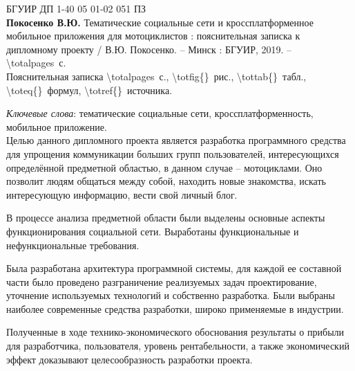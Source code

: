 \thispagestyle{empty}


\noindent
{БГУИР ДП 1-40 05 01-02 051 ПЗ}\\

\textbf{Покосенко В.Ю.} Тематические социальные сети и кроссплатформенное мобильное приложения для мотоциклистов : пояснительная записка к дипломному проекту / В.Ю. Покосенко. – Минск : БГУИР, 2019. – \num{\totalpages}~с. \\

Пояснительная записка \num{\totalpages}~с., \num{\totfig{}}~рис., \num{\tottab{}}~табл., \num{\toteq{}}~формул, \num{\totref{}}~источника.

\emph{Ключевые слова}: тематические социальные сети, кроссплатформенность, мобильное приложение. \\

Целью данного дипломного проекта является разработка программного средства 
для упрощения коммуникации больших групп пользователей,
интересующихся определённой предметной областью, в данном случае --
мотоциклами. Оно позволит людям общаться между собой, находить новые
знакомства, искать интересующую информацию, вести свой личный блог.

В процессе анализа предметной области были выделены основные аспекты функционирования социальной сети. Выработаны функциональные и нефункциональные требования.

Была разработана архитектура программной системы, для каждой ее составной части было проведено разграничение реализуемых задач проектирование, уточнение используемых технологий и собственно разработка. Были выбраны наиболее современные средства разработки, широко применяемые в индустрии. 

Полученные в ходе технико-экономического обоснования результаты о прибыли для разработчика, пользователя, уровень рентабельности, а также экономический эффект доказывают целесообразность разработки про\-екта.

